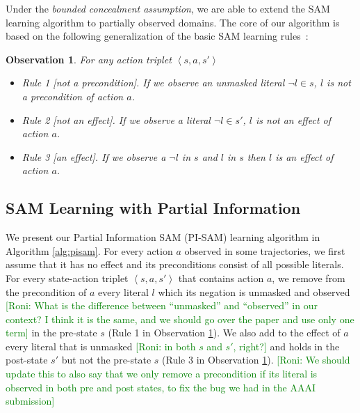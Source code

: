 \documentclass[letterpaper]{article} %
\newtheorem{observation}{Observation}
\newcommand{\tuple}[1]{\ensuremath{\left \langle #1 \right \rangle }}
\newcommand{\pre}{\textit{pre}}
\newcommand{\eff}{\textit{eff}}
\newcommand{\roni}[1]{{\textcolor{green}{[Roni: #1]}}}
\begin{document}
Under the \textit{bounded concealment assumption}, we are able to extend the SAM learning algorithm \cite{juba2021safe} to partially observed domains. The core of our algorithm is based on the following generalization of the basic SAM learning rules~\cite{stern2017efficientAndSafe,juba2021safe}:
\begin{observation}\label{obs:pi-sam-learning-rules}
For any action triplet $\tuple{s, a, s'}$%
\begin{itemize}
    \item Rule 1 [not a precondition]. If we observe an unmasked literal $\neg l \in s$, $l$ is not a precondition of action $a$. %
    
    \item Rule 2 [not an effect]. If we observe a literal $\neg l \in s'$, $l$ is not an effect of action $a$.
    
    \item Rule 3 [an effect]. If we observe a $\neg l$ in $s$ and  $l$ in $s$ then $l$ is an effect of action $a$. 
\end{itemize}
   

\end{observation}



\subsection{SAM Learning with Partial Information}
We present our Partial Information SAM (PI-SAM) learning algorithm in Algorithm \ref{alg:pisam}. For every action $a$ observed in some trajectories, we first assume that it has no effect and its preconditions consist of all possible literals. For every state-action triplet $\tuple{s, a, s'}$ that contains action $a$, we remove from the precondition of $a$ every literal $l$ which its negation is unmasked and observed \roni{What is the difference between ``unmasked'' and ``observed'' in our context? I think it is the same, and we should go over the paper and use only one term} in the pre-state $s$ (Rule 1 in Observation \ref{obs:pi-sam-learning-rules}). We also add to the effect of $a$ every literal that is unmasked \roni{in both $s$ and $s'$, right?} and holds in the post-state $s'$ but not the pre-state $s$ (Rule 3 in Observation \ref{obs:pi-sam-learning-rules}). 
\roni{We should update this to also say that we only remove a precondition if its literal is observed in both pre and post states, to fix the bug we had in the AAAI submission}
\end{document}
